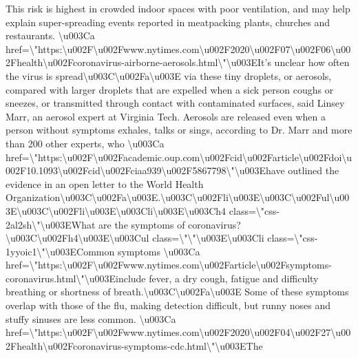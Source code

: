 This risk is highest in crowded indoor spaces with poor ventilation, and
may help explain super-spreading events reported in meatpacking plants,
churches and restaurants. \textbackslash{}u003Ca
href=\textbackslash{}"https:\textbackslash{}u002F\textbackslash{}u002Fwww.nytimes.com\textbackslash{}u002F2020\textbackslash{}u002F07\textbackslash{}u002F06\textbackslash{}u002Fhealth\textbackslash{}u002Fcoronavirus-airborne-aerosols.html\textbackslash{}"\textbackslash{}u003EIt's
unclear how often the virus is
spread\textbackslash{}u003C\textbackslash{}u002Fa\textbackslash{}u003E
via these tiny droplets, or aerosols, compared with larger droplets that
are expelled when a sick person coughs or sneezes, or transmitted
through contact with contaminated surfaces, said Linsey Marr, an aerosol
expert at Virginia Tech. Aerosols are released even when a person
without symptoms exhales, talks or sings, according to Dr. Marr and more
than 200 other experts, who \textbackslash{}u003Ca
href=\textbackslash{}"https:\textbackslash{}u002F\textbackslash{}u002Facademic.oup.com\textbackslash{}u002Fcid\textbackslash{}u002Farticle\textbackslash{}u002Fdoi\textbackslash{}u002F10.1093\textbackslash{}u002Fcid\textbackslash{}u002Fciaa939\textbackslash{}u002F5867798\textbackslash{}"\textbackslash{}u003Ehave
outlined the evidence in an open letter to the World Health
Organization\textbackslash{}u003C\textbackslash{}u002Fa\textbackslash{}u003E.\textbackslash{}u003C\textbackslash{}u002Fli\textbackslash{}u003E\textbackslash{}u003C\textbackslash{}u002Ful\textbackslash{}u003E\textbackslash{}u003C\textbackslash{}u002Fli\textbackslash{}u003E\textbackslash{}u003Cli\textbackslash{}u003E\textbackslash{}u003Ch4
class=\textbackslash{}"css-2al2sh\textbackslash{}"\textbackslash{}u003EWhat
are the symptoms of
coronavirus?\textbackslash{}u003C\textbackslash{}u002Fh4\textbackslash{}u003E\textbackslash{}u003Cul
class=\textbackslash{}"\textbackslash{}"\textbackslash{}u003E\textbackslash{}u003Cli
class=\textbackslash{}"css-1yyoic1\textbackslash{}"\textbackslash{}u003ECommon
symptoms \textbackslash{}u003Ca
href=\textbackslash{}"https:\textbackslash{}u002F\textbackslash{}u002Fwww.nytimes.com\textbackslash{}u002Farticle\textbackslash{}u002Fsymptoms-coronavirus.html\textbackslash{}"\textbackslash{}u003Einclude
fever, a dry cough, fatigue and difficulty breathing or shortness of
breath.\textbackslash{}u003C\textbackslash{}u002Fa\textbackslash{}u003E
Some of these symptoms overlap with those of the flu, making detection
difficult, but runny noses and stuffy sinuses are less common.
\textbackslash{}u003Ca
href=\textbackslash{}"https:\textbackslash{}u002F\textbackslash{}u002Fwww.nytimes.com\textbackslash{}u002F2020\textbackslash{}u002F04\textbackslash{}u002F27\textbackslash{}u002Fhealth\textbackslash{}u002Fcoronavirus-symptoms-cdc.html\textbackslash{}"\textbackslash{}u003EThe
